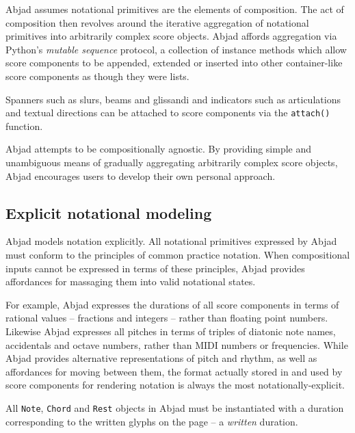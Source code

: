 Abjad assumes notational primitives are the elements of composition. The act of
composition then revolves around the iterative aggregation of notational
primitives into arbitrarily complex score objects. Abjad affords aggregation
via Python's \emph{mutable sequence} protocol, a collection of instance methods
which allow score components to be appended, extended or inserted into other
container-like score components as though they were lists.

Spanners such as slurs, beams and glissandi and indicators such as
articulations and textual directions can be attached to score components via
the \texttt{attach()} function.

Abjad attempts to be compositionally agnostic. By providing simple and
unambiguous means of gradually aggregating arbitrarily complex score objects,
Abjad encourages users to develop their own personal approach.

\subsection{Explicit notational modeling}

Abjad models notation explicitly. All notational primitives expressed by Abjad
must conform to the principles of common practice notation. When compositional
inputs cannot be expressed in terms of these principles, Abjad provides
affordances for massaging them into valid notational states.

For example, Abjad expresses the durations of all score components in terms of
rational values -- fractions and integers -- rather than floating point
numbers. Likewise Abjad expresses all pitches in terms of triples of diatonic
note names, accidentals and octave numbers, rather than MIDI numbers or
frequencies. While Abjad provides alternative representations of pitch and
rhythm, as well as affordances for moving between them, the format actually
stored in and used by score components for rendering notation is always the
most notationally-explicit.


All \texttt{Note}, \texttt{Chord} and \texttt{Rest} objects in Abjad must be
instantiated with a duration corresponding to the written glyphs on the page --
a \emph{written} duration.

